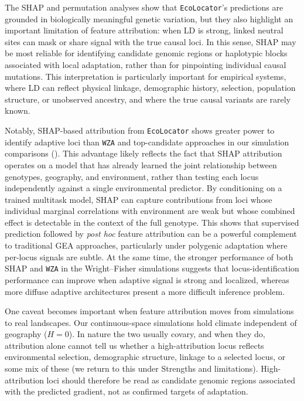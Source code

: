\documentclass[]{article}
\newcommand{\ecolocator}{\texttt{EcoLocator}\xspace}
\begin{document}
The SHAP and permutation analyses show that \ecolocator's predictions
are grounded in biologically meaningful genetic variation,
but they also highlight an important limitation of feature attribution:
when LD is strong,
linked neutral sites can mask or share signal with the true causal loci.
In this sense,
SHAP may be most reliable for identifying candidate genomic regions
or haplotypic blocks associated with local adaptation,
rather than for pinpointing individual causal mutations.
This interpretation is particularly important for empirical systems,
where LD can reflect physical linkage,
demographic history,
selection,
population structure,
or unobserved ancestry,
and where the true causal variants are rarely known.

Notably,
SHAP-based attribution from \ecolocator
shows greater power to identify adaptive loci
than \texttt{WZA} \citep{booker_wza_2024}
and top-candidate approaches
in our simulation comparisons
().
This advantage likely reflects the fact
that SHAP attribution operates on a model
that has already learned the joint relationship
between genotypes,
geography,
and environment,
rather than testing each locus independently
against a single environmental predictor.
By conditioning on a trained multitask model,
SHAP can capture contributions from loci
whose individual marginal correlations with environment are weak
but whose combined effect is detectable
in the context of the full genotype.
This shows that supervised prediction
followed by \textit{post hoc} feature attribution
can be a powerful complement to traditional GEA approaches,
particularly under polygenic adaptation
where per-locus signals are subtle.
At the same time, 
the stronger performance of both SHAP and \texttt{WZA}
in the Wright--Fisher simulations suggests that 
locus-identification performance can improve 
when adaptive signal is strong and localized,
whereas more diffuse adaptive architectures 
present a more difficult inference problem.

One caveat becomes important when feature attribution moves
from simulations to real landscapes.
Our continuous-space simulations hold climate independent of geography ($H=0$).
In nature the two usually covary, and when they do,
attribution alone cannot tell us whether a high-attribution locus
reflects environmental selection, demographic structure,
linkage to a selected locus, or some mix of these
(we return to this under Strengths and limitations). %
High-attribution loci should therefore be read as candidate
genomic regions associated with the predicted gradient,
not as confirmed targets of adaptation.
\end{document}
